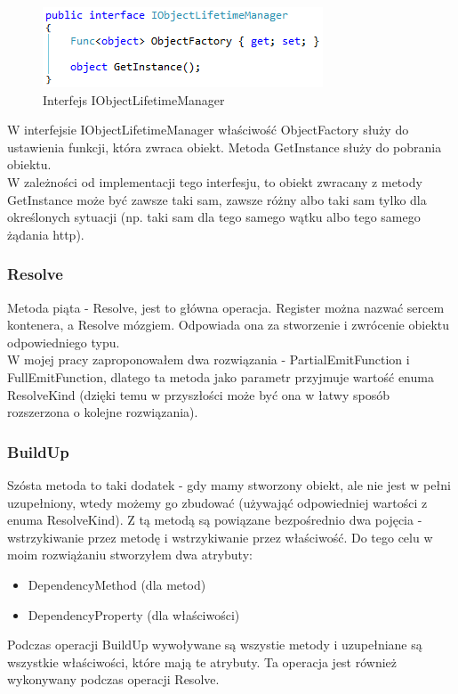 \documentclass[12pt]{article}
\begin{document}
\clearpage
\begin{figure}[H]
	\begin{center}
  		\includegraphics{IObjectLifetimeManager.png}
  		\caption{Interfejs IObjectLifetimeManager}
  		\label{fig:IObjectLifetimeManager}
	\end{center}
\end{figure}
W interfejsie IObjectLifetimeManager właściwość ObjectFactory służy do ustawienia funkcji, która zwraca obiekt. Metoda GetInstance służy do pobrania obiektu.\\
W zależności od implementacji tego interfesju, to obiekt zwracany z metody GetInstance może być zawsze taki sam, zawsze różny albo taki sam tylko dla określonych sytuacji (np. taki sam dla tego samego wątku albo tego samego żądania http).

\subsubsection{Resolve}
Metoda piąta - Resolve, jest to główna operacja. Register można nazwać sercem kontenera, a Resolve mózgiem. Odpowiada ona za stworzenie i zwrócenie obiektu odpowiedniego typu.\\
W mojej pracy zaproponowałem dwa rozwiązania - PartialEmitFunction i FullEmitFunction, dlatego ta metoda jako parametr przyjmuje wartość enuma ResolveKind (dzięki temu w przyszłości może być ona w łatwy sposób rozszerzona o kolejne rozwiązania).

\subsubsection{BuildUp}
Szósta metoda to taki dodatek - gdy mamy stworzony obiekt, ale nie jest w pełni uzupełniony, wtedy możemy go zbudować (używająć odpowiedniej wartości z enuma ResolveKind). Z tą metodą są powiązane bezpośrednio dwa pojęcia - wstrzykiwanie przez metodę i wstrzykiwanie przez właściwość. Do tego celu w moim rozwiążaniu stworzyłem dwa atrybuty:
\begin{itemize}
	\item DependencyMethod (dla metod)
	\item DependencyProperty (dla właściwości)
\end{itemize}
Podczas operacji BuildUp wywoływane są wszystie metody i uzupełniane są wszystkie właściwości, które mają te atrybuty. Ta operacja jest również wykonywany podczas operacji Resolve.\\
\end{document}

